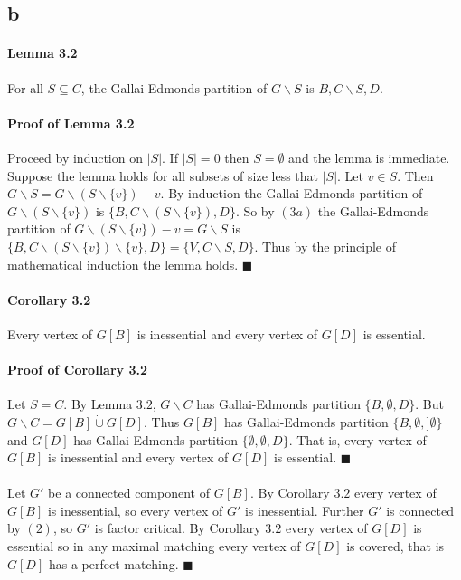 \documentclass[letterpaper,12pt,oneside,onecolumn]{report}
\begin{document}
\subsection*{b}
\paragraph{Lemma 3.2}
For all $S \subseteq C$, the Gallai-Edmonds partition of $G\backslash S$ is $B, C\backslash S, D$.
\paragraph{Proof of Lemma 3.2}
Proceed by induction on $|S|$. If $|S|  = 0$ then $S = \emptyset$ and the lemma is immediate. Suppose the lemma holds for all subsets of size less that $|S|$. Let $v \in S$. Then $G\backslash S = G\backslash (S \backslash \{v\}) - v$. By induction the Gallai-Edmonds partition of $G\backslash (S\backslash \{v\})$ is $\{B, C\backslash (S\backslash \{v\}), D \}$. So by $(3a)$ the Gallai-Edmonds partition of $G\backslash (S \backslash \{v\}) - v = G\backslash S$ is $\{B, C\backslash (S\backslash \{v\})\backslash \{v\}, D\} = \{V, C\backslash S, D\}$. Thus by the principle of mathematical induction the lemma holds. $\blacksquare$
\paragraph{Corollary 3.2}
Every vertex of $G[B]$ is inessential and every vertex of $G[D]$ is essential.
\paragraph{Proof of Corollary 3.2}
Let $S = C$. By Lemma $3.2$, $G\backslash C$ has Gallai-Edmonds partition $\{B, \emptyset, D\}$. But $G \backslash C = G[B] \dot \cup G[D]$. Thus $G[B]$ has Gallai-Edmonds partition $\{B, \emptyset, ]\emptyset\}$ and $G[D]$ has Gallai-Edmonds partition $\{\emptyset, \emptyset, D\}$. That is, every vertex of $G[B]$ is inessential and every vertex of $G[D]$ is essential. $\blacksquare$
\paragraph{}
Let $G'$ be a connected component of $G[B]$. By Corollary $3.2$ every vertex of $G[B]$ is inessential, so every vertex of $G'$ is inessential. Further $G'$ is connected by $(2)$, so $G'$ is factor critical. By Corollary $3.2$ every vertex of $G[D]$ is essential so in any maximal matching every vertex of $G[D]$ is covered, that is $G[D]$ has a perfect matching. $\blacksquare$
\end{document}
